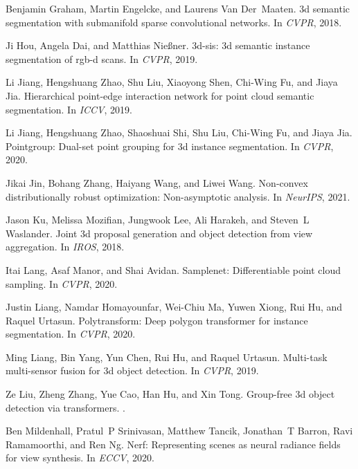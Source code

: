 \documentclass[final]{cvpr}
\begin{document}
{\begin{thebibliography}{10}
Benjamin Graham, Martin Engelcke, and Laurens Van Der~Maaten.
\newblock 3d semantic segmentation with submanifold sparse convolutional
  networks.
\newblock In {\em CVPR}, 2018.

Ji Hou, Angela Dai, and Matthias Nie{\ss}ner.
\newblock 3d-sis: 3d semantic instance segmentation of rgb-d scans.
\newblock In {\em CVPR}, 2019.

Li Jiang, Hengshuang Zhao, Shu Liu, Xiaoyong Shen, Chi-Wing Fu, and Jiaya Jia.
\newblock Hierarchical point-edge interaction network for point cloud semantic
  segmentation.
\newblock In {\em ICCV}, 2019.

Li Jiang, Hengshuang Zhao, Shaoshuai Shi, Shu Liu, Chi-Wing Fu, and Jiaya Jia.
\newblock Pointgroup: Dual-set point grouping for 3d instance segmentation.
\newblock In {\em CVPR}, 2020.

Jikai Jin, Bohang Zhang, Haiyang Wang, and Liwei Wang.
\newblock Non-convex distributionally robust optimization: Non-asymptotic
  analysis.
\newblock In {\em NeurIPS}, 2021.

Jason Ku, Melissa Mozifian, Jungwook Lee, Ali Harakeh, and Steven~L Waslander.
\newblock Joint 3d proposal generation and object detection from view
  aggregation.
\newblock In {\em IROS}, 2018.

Itai Lang, Asaf Manor, and Shai Avidan.
\newblock Samplenet: Differentiable point cloud sampling.
\newblock In {\em CVPR}, 2020.

Justin Liang, Namdar Homayounfar, Wei-Chiu Ma, Yuwen Xiong, Rui Hu, and Raquel
  Urtasun.
\newblock Polytransform: Deep polygon transformer for instance segmentation.
\newblock In {\em CVPR}, 2020.

Ming Liang, Bin Yang, Yun Chen, Rui Hu, and Raquel Urtasun.
\newblock Multi-task multi-sensor fusion for 3d object detection.
\newblock In {\em CVPR}, 2019.

Ze Liu, Zheng Zhang, Yue Cao, Han Hu, and Xin Tong.
\newblock Group-free 3d object detection via transformers.
.

Ben Mildenhall, Pratul~P Srinivasan, Matthew Tancik, Jonathan~T Barron, Ravi
  Ramamoorthi, and Ren Ng.
\newblock Nerf: Representing scenes as neural radiance fields for view
  synthesis.
\newblock In {\em ECCV}, 2020.


\end{thebibliography}}
\end{document}
